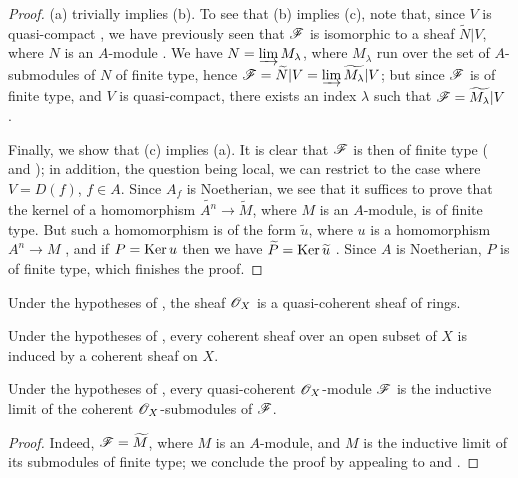 \begin{proof}
\label{proof-1.1.5.1}
(a) trivially implies (b).
To see that (b) implies (c), note that, since $V$ is quasi-compact , we have previously seen that $\mathscr{F}$ is isomorphic to a sheaf $\widetilde{N}|V$, where $N$ is an $A$-module .
We have $N=\varinjlim M_\lambda$, where $M_\lambda$ run over the set of $A$-submodules of $N$ of finite type, hence  $\mathscr{F}=\widetilde{N}|V=\varinjlim\widetilde{M_\lambda}|V$;
but since $\mathscr{F}$ is of finite type, and $V$ is quasi-compact, there exists an index $\lambda$ such that $\mathscr{F}=\widetilde{M_\lambda}|V$ .

Finally, we show that (c) implies (a).
It is clear that $\mathscr{F}$ is then of finite type ( and );
in addition, the question being local, we can restrict to the case where $V=D(f)$, $f\in A$.
Since $A_f$ is Noetherian, we see that it suffices to prove that the kernel of a homomorphism $\widetilde{A^n}\to\widetilde{M}$, where $M$ is an $A$-module, is of finite type.
But such a homomorphism is of the form $\widetilde{u}$, where $u$ is a homomorphism $A^n\to M$ , and if $P=\operatorname{Ker} u$ then we have $\widetilde{P}=\operatorname{Ker}\widetilde{u}$ .
Since $A$ is Noetherian, $P$ is of finite type, which finishes the proof.
\end{proof}

\begin{corollary}[1.5.2]
\label{1.1.5.2}
Under the hypotheses of , the sheaf $\mathscr{O}_X$ is a quasi-coherent sheaf of rings.
\end{corollary}

\begin{corollary}[1.5.3]
\label{1.1.5.3}
Under the hypotheses of , every coherent sheaf over an open subset of $X$ is induced by a coherent sheaf on $X$.
\end{corollary}

\begin{corollary}[1.5.4]
\label{1.1.5.4}
Under the hypotheses of , every quasi-coherent $\mathscr{O}_X$-module $\mathscr{F}$ is the inductive limit of the coherent $\mathscr{O}_X$-submodules of $\mathscr{F}$.
\end{corollary}

\begin{proof}
\label{proof-1.1.5.4}
Indeed, $\mathscr{F}=\widetilde{M}$, where $M$ is an $A$-module, and $M$ is the inductive limit of its submodules of finite type;
we conclude the proof by appealing to  and .
\end{proof}

